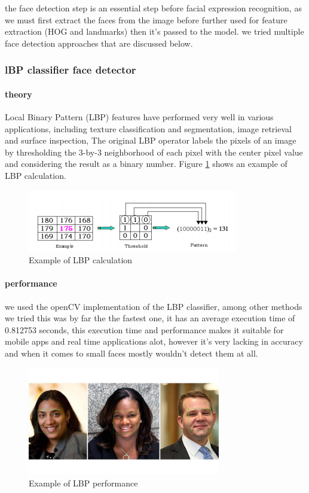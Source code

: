 the face detection step is an essential step before facial expression recognition, as we must first extract the faces from the image before further used for feature extraction (HOG and landmarks) then it's passed to the model.
\newline
we tried multiple face detection approaches that are discussed below.
\subsubsection{lBP classifier face detector}

\paragraph{theory}
Local Binary Pattern (LBP) features have performed very well in various applications, including texture classification and segmentation, image retrieval and surface inspection, The original LBP operator labels the pixels of an image by thresholding the 3-by-3 neighborhood of each pixel with the
center pixel value and considering the result as a binary number.
Figure \ref{fig:LBP_calculation} shows an example of LBP calculation. 

\begin{figure}
	\centering
	\includegraphics{images/LBP_classifier.png}
	\caption{Example of LBP calculation}
	\label{fig:LBP_calculation}
\end{figure}

\paragraph{performance}
we used the openCV implementation of the LBP classifier, among other methods we tried this was by far the the fastest one, it has an average execution time of 0.812753 seconds, this execution time and performance makes it suitable for mobile apps and real time applications alot, however it's very lacking in accuracy and when it comes to small faces mostly wouldn't detect them at all.

\begin{figure}
	\centering
	\includegraphics[width=0.75\textwidth]{images/lbp_example.jpg}
	\caption{Example of LBP performance}
	\label{fig:LBP_example}
\end{figure}


